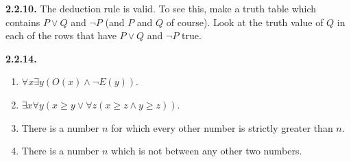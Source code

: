 \documentclass[12pt,]{book}
\theoremstyle{plain}
\theoremstyle{definition}
\theoremstyle{definition}
\theoremstyle{definition}
\numberwithin{equation}{chapter}
\begin{document}
%
\par\smallskip
\noindent\textbf{2.2.10.} \hypertarget{p-1290}{}%
The deduction rule is valid. To see this, make a truth table which contains \(P \vee Q\) and \(\neg P\) (and \(P\) and \(Q\) of course). Look at the truth value of \(Q\) in each of the rows that have \(P \vee Q\) and \(\neg P\) true.%
\par\smallskip
\noindent\textbf{2.2.14.} \hypertarget{p-1302}{}%
\leavevmode%
\begin{enumerate}[label=(\alph*)]
\item\hypertarget{li-639}{}\(\forall x \exists y (O(x) \wedge \neg E(y))\).%
\item\hypertarget{li-640}{}\(\exists x \forall y (x \ge y \vee \forall z (x \ge z \wedge y \ge z))\).%
\item\hypertarget{li-641}{}\hypertarget{p-1303}{}%
There is a number \(n\) for which every other number is strictly greater than \(n\).%
\item\hypertarget{li-642}{}\hypertarget{p-1304}{}%
There is a number \(n\) which is not between any other two numbers.%
\end{enumerate}
%
\par\smallskip
\end{document}
